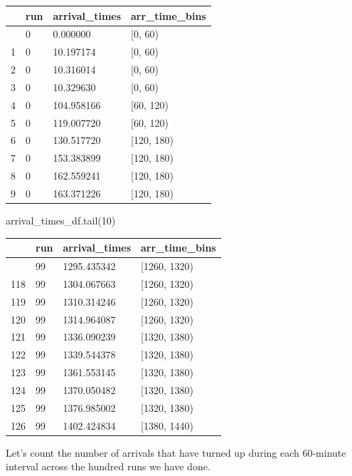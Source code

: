 \documentclass[
  letterpaper,
  DIV=11,
  numbers=noendperiod]{scrreprt}
\newenvironment{Shaded}{}{}
\newcommand{\DecValTok}[1]{\textcolor[rgb]{0.00,0.36,0.77}{#1}}
\newcommand{\NormalTok}[1]{\textcolor[rgb]{0.14,0.16,0.18}{#1}}
\begin{document}
\begin{longtable}[]{@{}llll@{}}
\toprule\noalign{}
& run & arrival\_times & arr\_time\_bins \\
\midrule\noalign{}
\endhead
\bottomrule\noalign{}
\endlastfoot
0 & 0 & 0.000000 & {[}0, 60) \\
1 & 0 & 10.197174 & {[}0, 60) \\
2 & 0 & 10.316014 & {[}0, 60) \\
3 & 0 & 10.329630 & {[}0, 60) \\
4 & 0 & 104.958166 & {[}60, 120) \\
5 & 0 & 119.007720 & {[}60, 120) \\
6 & 0 & 130.517720 & {[}120, 180) \\
7 & 0 & 153.383899 & {[}120, 180) \\
8 & 0 & 162.559241 & {[}120, 180) \\
9 & 0 & 163.371226 & {[}120, 180) \\
\end{longtable}

\begin{Shaded}
\begin{Highlighting}[]
\NormalTok{arrival\_times\_df.tail(}\DecValTok{10}\NormalTok{)}
\end{Highlighting}
\end{Shaded}

\begin{longtable}[]{@{}llll@{}}
\toprule\noalign{}
& run & arrival\_times & arr\_time\_bins \\
\midrule\noalign{}
\endhead
\bottomrule\noalign{}
\endlastfoot
117 & 99 & 1295.435342 & {[}1260, 1320) \\
118 & 99 & 1304.067663 & {[}1260, 1320) \\
119 & 99 & 1310.314246 & {[}1260, 1320) \\
120 & 99 & 1314.964087 & {[}1260, 1320) \\
121 & 99 & 1336.090239 & {[}1320, 1380) \\
122 & 99 & 1339.544378 & {[}1320, 1380) \\
123 & 99 & 1361.553145 & {[}1320, 1380) \\
124 & 99 & 1370.050482 & {[}1320, 1380) \\
125 & 99 & 1376.985002 & {[}1320, 1380) \\
126 & 99 & 1402.424834 & {[}1380, 1440) \\
\end{longtable}

Let's count the number of arrivals that have turned up during each
60-minute interval across the hundred runs we have done.
\end{document}

